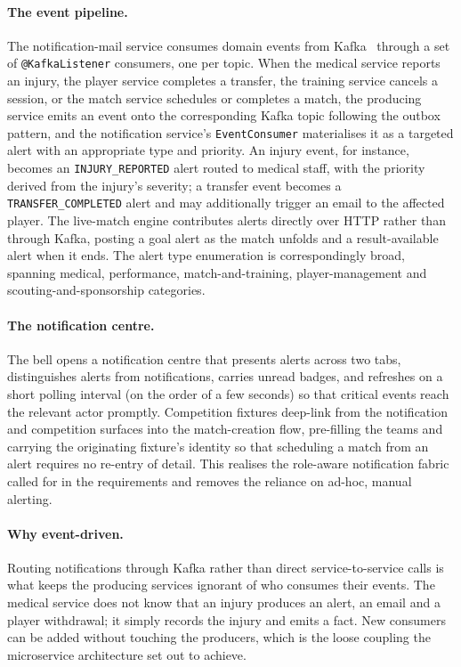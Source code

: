 \paragraph{The event pipeline.} The notification-mail service consumes domain events from Kafka~\cite{kafka} through a
set of \texttt{@KafkaListener} consumers, one per topic. When the medical service reports an injury, the player service
completes a transfer, the training service cancels a session, or the match service schedules or completes a match, the
producing service emits an event onto the corresponding Kafka topic following the outbox pattern, and the notification
service's \texttt{EventConsumer} materialises it as a targeted alert with an appropriate type and priority. An injury
event, for instance, becomes an \texttt{INJURY\_REPORTED} alert routed to medical staff, with the priority derived from
the injury's severity; a transfer event becomes a \texttt{TRANSFER\_COMPLETED} alert and may additionally trigger an email
to the affected player. The live-match engine contributes alerts directly over HTTP rather than through Kafka, posting a
goal alert as the match unfolds and a result-available alert when it ends. The alert type enumeration is correspondingly
broad, spanning medical, performance, match-and-training, player-management and scouting-and-sponsorship categories.

\paragraph{The notification centre.} The bell opens a notification centre that presents alerts across two tabs,
distinguishes alerts from notifications, carries unread badges, and refreshes on a short polling interval (on the order of
a few seconds) so that critical events reach the relevant actor promptly. Competition fixtures deep-link from the
notification and competition surfaces into the match-creation flow, pre-filling the teams and carrying the originating
fixture's identity so that scheduling a match from an alert requires no re-entry of detail. This realises the role-aware
notification fabric called for in the requirements and removes the reliance on ad-hoc, manual alerting.

\paragraph{Why event-driven.} Routing notifications through Kafka rather than direct service-to-service calls is what keeps
the producing services ignorant of who consumes their events. The medical service does not know that an injury produces an
alert, an email and a player withdrawal; it simply records the injury and emits a fact. New consumers can be added without
touching the producers, which is the loose coupling the microservice architecture set out to achieve.

